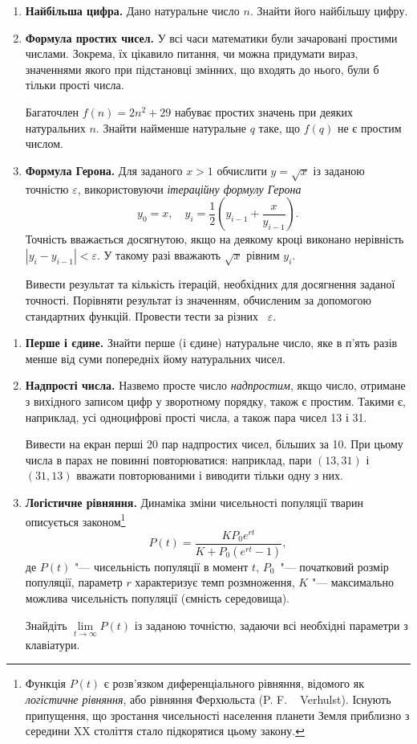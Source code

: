 
\begin{enumerate}
\item \textbf{Найбільша цифра.} Дано натуральне число $n$. Знайти його найбільшу цифру.

\item \textbf{Формула простих чисел.} У всі часи математики були зачаровані простими числами. Зокрема, їх цікавило питання, чи можна придумати вираз, значеннями якого при підстановці змінних, що входять до нього, були б тільки прості числа.

Багаточлен $f(n)=2n^2+29$ набуває простих значень при деяких натуральних $n$. Знайти найменше натуральне $q$ таке, що $f(q)$ не є простим числом.
\item \textbf{Формула Герона.} Для заданого $x>1$ обчислити $y=\sqrt{x}$ із заданою точністю $\varepsilon$, використовуючи {\itshape ітераційну формулу Герона}
$$
y_0 = x,\quad y_i = \frac{1}{2}\left(y_{i-1}+\frac{x}{y_{i-1}}\right).
$$
Точність вважається досягнутою, якщо на деякому кроці виконано нерівність $\left|y_{i}-y_{i-1}\right|<\varepsilon$. У такому разі вважають $\sqrt{x}$ рівним $y_i$.

Вивести результат та кількість ітерацій, необхідних для досягнення заданої точності. Порівняти результат із значенням, обчисленим за допомогою стандартних функцій. Провести тести за різних ~$\varepsilon$.\end{enumerate}




\begin{enumerate}
\item \textbf{Перше і єдине.} Знайти перше (і єдине) натуральне число, яке в п'ять разів менше від суми попередніх йому натуральних чисел.
\item \textbf{Надпрості числа.} Назвемо просте число {\itshape надпростим}, якщо число, отримане з вихідного записом цифр у зворотному порядку, також є простим. Такими є, наприклад, усі одноцифрові прості числа, а також пара чисел 13 і 31.

Вивести на екран перші 20 пар надпростих чисел, більших за 10. При цьому числа в парах не повинні повторюватися: наприклад, пари $(13, 31)$ і $(31, 13)$ вважати повторюваними і виводити тільки одну з них.
\item \textbf{Логістичне рівняння.} Динаміка зміни чисельності популяції тварин описується законом\footnote[1]{Функція $P(t)$ є розв'язком диференціального рівняння, відомого як {\itshape логістичне рівняння}, або рівняння Ферхюльста (P. F. ~ Verhulst). Існують припущення, що зростання чисельності населення планети Земля приблизно з середини XX століття стало підкорятися цьому закону.}
$$
P(t)=\frac{KP_0e^{rt}}{K+P_0(e^{rt}-1)},
$$
де $P(t)$ "--- чисельність популяції в момент $t$, $P_0$~"--- початковий розмір популяції, параметр $r$ характеризує темп розмноження, $K$ "--- максимально можлива чисельність популяції (ємність середовища).

Знайдіть $\lim\limits_{t\to\infty}P(t)$ із заданою точністю, задаючи всі необхідні параметри з клавіатури.
\end{enumerate}



